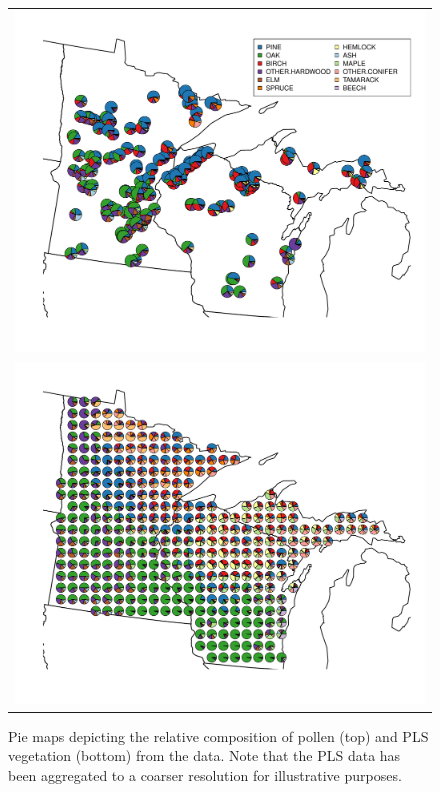 

\begin{figure}
\centering
\begin{tabular}{c}
\includegraphics[width=5in]{figures/pie_plot_pollen_UMW_v01.pdf} \\
\includegraphics[width=5in]{figures/pie_plot_pls_UMW_v01.pdf}
\end{tabular}
\caption{Pie maps depicting the relative composition of pollen (top)
  and PLS vegetation (bottom) from the data. Note that the PLS data
  has been aggregated to a coarser resolution for illustrative
  purposes.}
\label{fig:pie}
\end{figure}

